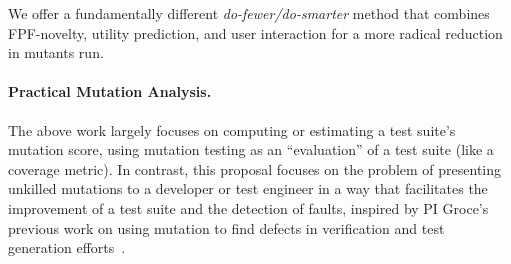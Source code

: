 We offer a fundamentally
different \emph{do-fewer/do-smarter} method that combines FPF-novelty, utility
prediction, and user interaction for a more radical reduction in
mutants run.


%

\paragraph{Practical Mutation Analysis.}
%
The above work largely focuses on computing or estimating a test suite's
mutation score, using mutation testing as an ``evaluation'' of a test suite
(like a coverage metric). In contrast,
this proposal focuses on the problem of presenting unkilled mutations to
a developer or test engineer in a way that facilitates the improvement
of a test suite and the detection of faults, inspired by PI Groce's
previous work on using mutation to find defects in verification
and test generation
efforts~\cite{groce2015verified,groce2018verified,mutKernel}.

